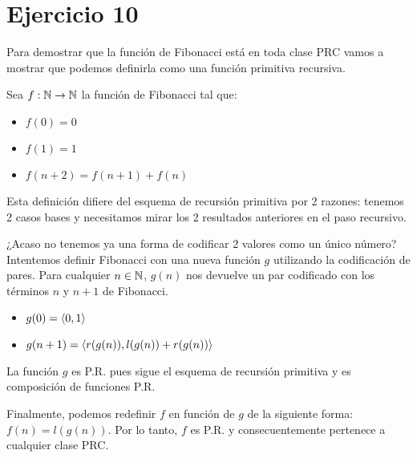 \section*{Ejercicio 10}

Para demostrar que la función de Fibonacci está en toda clase PRC vamos a mostrar que podemos definirla como una función primitiva recursiva.

Sea $f: \mathbb{N} \to \mathbb{N}$ la función de Fibonacci tal que:

\begin{itemize}
    \item $f(0) = 0$
    \item $f(1) = 1$
    \item $f(n + 2) = f(n + 1) + f(n)$
\end{itemize}

Esta definición difiere del esquema de recursión primitiva por 2 razones: tenemos 2 casos bases y necesitamos mirar los 2 resultados anteriores en el paso recursivo.

¿Acaso no tenemos ya una forma de codificar 2 valores como un único número? Intentemos definir Fibonacci con una nueva función $g$ utilizando la codificación de pares. Para cualquier $n \in \mathbb{N}$, $g(n)$ nos devuelve un par codificado con los términos $n$ y $n+1$ de Fibonacci.

\begin{itemize}
    \item $g(0) = \langle 0, 1 \rangle$
    \item $g(n + 1) = \langle r(g(n)), l(g(n)) + r(g(n)) \rangle$
\end{itemize}

La función $g$ es P.R. pues sigue el esquema de recursión primitiva y es composición de funciones P.R.

Finalmente, podemos redefinir $f$ en función de $g$ de la siguiente forma: $f(n) = l(g(n))$. Por lo tanto, $f$ es P.R. y consecuentemente pertenece a cualquier clase PRC.
